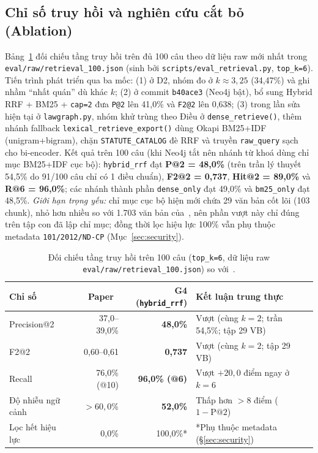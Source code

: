 \documentclass[sigconf,nonacm]{acmart}
\begin{document}
\subsection{Chỉ số truy hồi và nghiên cứu cắt bỏ (Ablation)}
Bảng~\ref{tab:retrieval} đối chiếu tầng truy hồi trên đủ 100 câu theo dữ liệu raw mới nhất trong \texttt{eval/raw/retrieval\_100.json} (sinh bởi \texttt{scripts/eval\_retrieval.py}, \texttt{top\_k=6}). Tiến trình phát triển qua ba mốc: (1) ở D2, nhóm đo ở $k \approx 3,25$ (34,47\%) và ghi nhầm ``nhất quán'' dù khác $k$; (2) ở commit \texttt{b40ace3} (Neo4j bật), bổ sung Hybrid RRF + BM25 + \texttt{cap=2} đưa \texttt{P@2} lên 41,0\% và \texttt{F2@2} lên 0,638; (3) trong lần sửa hiện tại ở \texttt{lawgraph.py}, nhóm khử trùng theo Điều ở \texttt{dense\_retrieve()}, thêm nhánh fallback \texttt{lexical\_retrieve\_export()} dùng Okapi BM25+IDF (unigram+bigram), chặn \texttt{STATUTE\_CATALOG} đè RRF và truyền \texttt{raw\_query} sạch cho bi-encoder. Kết quả trên 100 câu (khi Neo4j tắt nên nhánh từ khoá dùng chỉ mục BM25+IDF cục bộ): \texttt{hybrid\_rrf} đạt \textbf{P@2 = 48,0\%} (trên trần lý thuyết 54,5\% do 91/100 câu chỉ có 1 điều chuẩn), \textbf{F2@2 = 0,737}, \textbf{Hit@2 = 89,0\%} và \textbf{R@6 = 96,0\%}; các nhánh thành phần \texttt{dense\_only} đạt 49,0\% và \texttt{bm25\_only} đạt 48,5\%. \emph{Giới hạn trọng yếu:} chỉ mục cục bộ hiện mới chứa 29 văn bản cốt lõi (103 chunk), nhỏ hơn nhiều so với 1.703 văn bản của~\cite{phan2026sbv}, nên phần vượt này chỉ đúng trên tập con đã lập chỉ mục; đồng thời lọc hiệu lực 100\% vẫn phụ thuộc metadata \texttt{101/2012/ND-CP} (Mục~\ref{sec:security}).

\begin{table}[t]
\caption{Đối chiếu tầng truy hồi trên 100 câu (\texttt{top\_k=6}, dữ liệu raw \texttt{eval/raw/retrieval\_100.json}) so với~\cite{phan2026sbv}.}
\label{tab:retrieval}
\scriptsize
\begin{tabular}{@{}lrrp{2.7cm}@{}}
\toprule
\textbf{Chỉ số} & \textbf{Paper~\cite{phan2026sbv}} & \textbf{G4 (\texttt{hybrid\_rrf})} & \textbf{Kết luận trung thực} \\
\midrule
Precision@2 & 37,0--39,0\% & \textbf{48,0\%} & Vượt (cùng $k=2$; trần 54,5\%; tập 29 VB) \\
F2@2 & 0,60--0,61 & \textbf{0,737} & Vượt (cùng $k=2$; tập 29 VB) \\
Recall & 76,0\% (@10) & \textbf{96,0\% (@6)} & Vượt $+20,0$ điểm ngay ở $k=6$ \\
Độ nhiễu ngữ cảnh & $>60,0\%$ & \textbf{52,0\%} & Thấp hơn $>8$ điểm ($1 - \text{P@2}$) \\
Lọc hết hiệu lực & 0,0\% & 100,0\%* & *Phụ thuộc metadata (\S\ref{sec:security}) \\
\bottomrule
\end{tabular}
\end{table}
\end{document}
